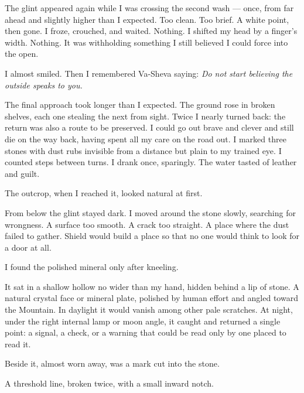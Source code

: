\ornament


The glint appeared again while I was crossing the second wash --- once, from far ahead and slightly higher than I expected. Too clean. Too brief. A white point, then gone. I froze, crouched, and waited. Nothing. I shifted my head by a finger's width. Nothing. It was withholding something I still believed I could force into the open.\par

I almost smiled. Then I remembered Va-Sheva saying: \textit{Do not start believing the outside speaks to you.}\par

The final approach took longer than I expected. The ground rose in broken shelves, each one stealing the next from sight. Twice I nearly turned back: the return was also a route to be preserved. I could go out brave and clever and still die on the way back, having spent all my care on the road out. I marked three stones with dust rubs invisible from a distance but plain to my trained eye. I counted steps between turns. I drank once, sparingly. The water tasted of leather and guilt.\par

The outcrop, when I reached it, looked natural at first.\par

From below the glint stayed dark. I moved around the stone slowly, searching for wrongness. A surface too smooth. A crack too straight. A place where the dust failed to gather. Shield would build a place so that no one would think to look for a door at all.\par

I found the polished mineral only after kneeling.\par

It sat in a shallow hollow no wider than my hand, hidden behind a lip of stone. A natural crystal face or mineral plate, polished by human effort and angled toward the Mountain. In daylight it would vanish among other pale scratches. At night, under the right internal lamp or moon angle, it caught and returned a single point: a signal, a check, or a warning that could be read only by one placed to read it.\par

Beside it, almost worn away, was a mark cut into the stone.\par

A threshold line, broken twice, with a small inward notch.\par

